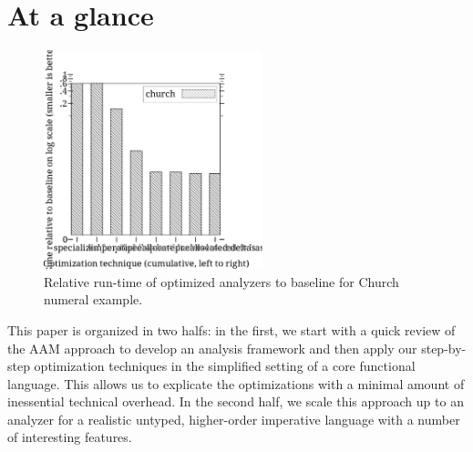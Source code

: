 \documentclass[preprint,onecolumn,9pt]{sigplanconf} %
\begin{document}





\section{At a glance}

\begin{figure}[t]
\begin{center}
\includegraphics[width=2.5in]{rel-time-church.ps}
\end{center}
\caption{Relative run-time of
optimized analyzers to baseline for Church numeral example.}
\label{fig:churchtime}
\end{figure}


This paper is organized in two halfs: in the first, we start with a
quick review of the AAM approach to develop an analysis framework and
then apply our step-by-step optimization techniques in the simplified
setting of a core functional language.  This allows us to explicate
the optimizations with a minimal amount of inessential technical
overhead.  In the second half, we scale this approach up to an
analyzer for a realistic untyped, higher-order imperative language
with a number of interesting features.
\end{document}
